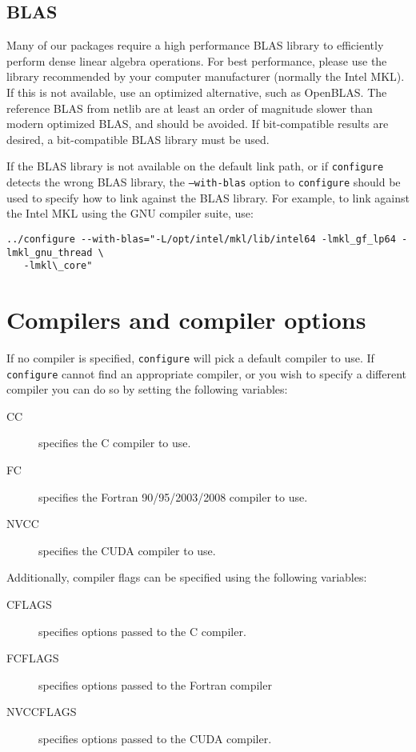 \subsection{BLAS}
Many of our packages require a high performance BLAS library to efficiently
perform dense linear algebra operations. For best performance, please use the
library recommended by your computer manufacturer (normally the Intel MKL).
If this is not available, use an optimized alternative, such as OpenBLAS.
The reference BLAS from netlib are at least an order of magnitude slower than
modern optimized BLAS, and should be avoided. If bit-compatible results are
desired, a bit-compatible BLAS library must be used.

If the BLAS library is not available on the default link path, or if
\texttt{configure} detects the wrong BLAS library, the \texttt{--with-blas}
option to \texttt{configure} should be used to specify how to link against
the BLAS library. For example, to link against the Intel MKL using the GNU
compiler suite, use: \\
\begin{verbatim}
../configure --with-blas="-L/opt/intel/mkl/lib/intel64 -lmkl_gf_lp64 -lmkl_gnu_thread \
   -lmkl\_core"
\end{verbatim}

\section{Compilers and compiler options}
If no compiler is specified, \texttt{configure} will pick a default
compiler to use. If \texttt{configure} cannot find an appropriate compiler, or
you wish to specify a different compiler you can do so by setting the following
variables:
\begin{description}
   \item[CC] specifies the C compiler to use.
   \item[FC] specifies the Fortran 90/95/2003/2008 compiler to use.
   \item[NVCC] specifies the CUDA compiler to use.
\end{description}
\vspace{0.1cm}

\noindent
Additionally, compiler flags can be specified using the following variables:
\begin{description}
   \item[CFLAGS] specifies options passed to the C compiler.
   \item[FCFLAGS] specifies options passed to the Fortran compiler
   \item[NVCCFLAGS] specifies options passed to the CUDA compiler.
\end{description}
\vspace{0.1cm}

